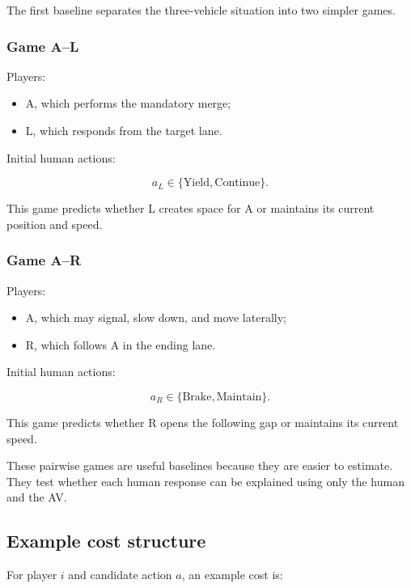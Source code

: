 \documentclass[11pt,a4paper]{article}
\begin{document}
The first baseline separates the three-vehicle situation into two simpler games.

\subsubsection{Game A--L}

Players:

\begin{itemize}[noitemsep]
  \item A, which performs the mandatory merge;
  \item L, which responds from the target lane.
\end{itemize}

Initial human actions:

\begin{equation}
a_L\in\{\text{Yield},\text{Continue}\}.
\end{equation}

This game predicts whether L creates space for A or maintains its current position and speed.

\subsubsection{Game A--R}

Players:

\begin{itemize}[noitemsep]
  \item A, which may signal, slow down, and move laterally;
  \item R, which follows A in the ending lane.
\end{itemize}

Initial human actions:

\begin{equation}
a_R\in\{\text{Brake},\text{Maintain}\}.
\end{equation}

This game predicts whether R opens the following gap or maintains its current speed.

These pairwise games are useful baselines because they are easier to estimate. They test whether each human response can be explained using only the human and the AV.

\subsection{Example cost structure}

For player $i$ and candidate action $a$, an example cost is:
\end{document}
